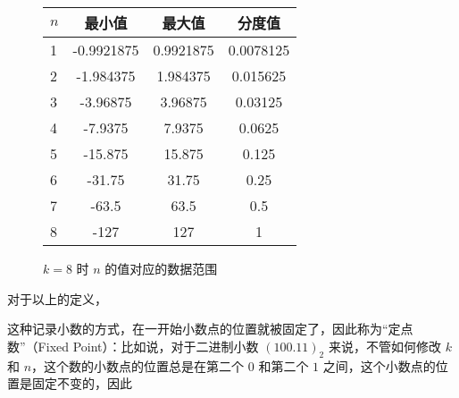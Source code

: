         \begin{figure}
            \centering
            \begin{tabular}{lS[table-format=-3.7]S[table-format=-3.7]S[table-format=-3.7]}
                $n$ & 最小值     & 最大值    & 分度值    \\    & -0.9921875 & 0.9921875  & 0.0078125 \\
                2   & -1.984375  & 1.984375   & 0.015625  \\
                3   & -3.96875   & 3.96875    & 0.03125   \\
                4   & -7.9375    & 7.9375     & 0.0625    \\
                5   & -15.875    & 15.875     & 0.125     \\
                6   & -31.75     & 31.75      & 0.25      \\
                7   & -63.5      & 63.5       & 0.5       \\
                8   & -127       & 127        & 1         \\
            \end{tabular}
            \caption{$k = 8$ 时 $n$ 的值对应的数据范围}
            \label{fig:NumberSystemBasics/FixedPointAndFloatingPoint/FixedPoint/DataRange}
        \end{figure}

        对于以上的定义，

        这种记录小数的方式，在一开始小数点的位置就被固定了，因此称为“定点数”（Fixed Point）：比如说，对于二进制小数 $(100.11)_2$ 来说，不管如何修改 $k$ 和 $n$，这个数的小数点的位置总是在第二个 $0$ 和第二个 $1$ 之间，这个小数点的位置是固定不变的，因此
